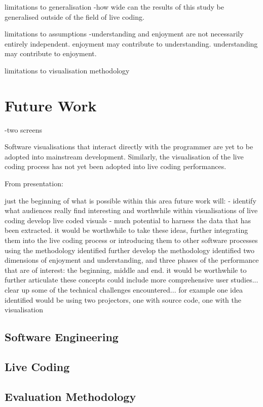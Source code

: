 limitations to generalisation
-how wide can the results of this study be generalised outside of the field of live coding.

limitations to assumptions
-understanding and enjoyment are not necessarily entirely independent. enjoyment may contribute to understanding. understanding may contribute to enjoyment.

limitations to visualisation methodology

\section{Future Work}

-two screens

Software visualisations that interact directly with the programmer are yet to be adopted into mainstream development. Similarly, the visualisation of the live coding process has not yet been adopted into live coding performances.

From presentation:

 just the beginning of what is possible within this area
future work will:
-  identify what audiences really find interesting and worthwhile within visualisations of live coding
develop live coded visuals - much potential to harness the data that has been extracted. it would be worthwhile to take these ideas, further integrating them into the live coding process or introducing them to other software processes using the methodology identified
 further develop the methodology
identified two dimensions of enjoyment and understanding, and three phases of the performance that are of interest: the beginning, middle and end. it would be worthwhile to further articulate these concepts
could include more comprehensive user studies... clear up some of the technical challenges encountered... for example one idea identified would be using two projectors, one with source code, one with the visualisation



\subsection{Software Engineering}


\subsection{Live Coding}


\subsection{Evaluation Methodology}

